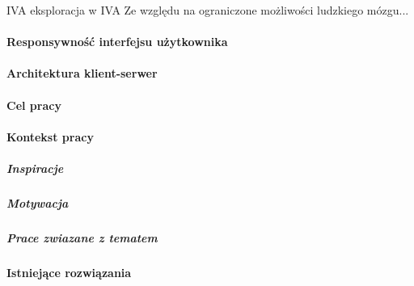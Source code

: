 IVA
eksploracja w IVA
Ze względu na ograniczone możliwości ludzkiego mózgu...

\paragraph{Responsywność interfejsu użytkownika}

\paragraph{Architektura klient-serwer}

\paragraph{Cel pracy}

\paragraph{Kontekst pracy}

\subparagraph{Inspiracje}

\subparagraph{Motywacja}

\subparagraph{Prace zwiazane z tematem}

\paragraph{Istniejące rozwiązania}




